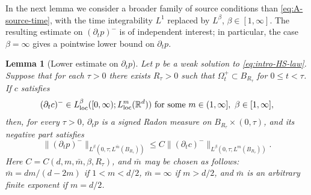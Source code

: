 \documentclass[11pt]{amsart}
\numberwithin{equation}{section}
\numberwithin{figure}{section}
\theoremstyle{plain}
\newtheorem{lem}[thm]{Lemma}
\theoremstyle{definition}
\theoremstyle{remark}
\theoremstyle{plain}
\newcommand{\norm}[1]{\lVert #1 \rVert}
\def\R{\mathbb{R}}
\begin{document}
In the next lemma we consider a broader family of source conditions than
\eqref{eq:A-source-time}, with the time integrability \(L^1\) replaced by \(L^\beta\),
\(\beta\in[1,\infty]\). The resulting estimate on \((\partial_t p)^-\) is of independent
interest; in particular, the case \(\beta=\infty\) gives a pointwise lower bound on
\(\partial_t p\).

\begin{lem}[Lower estimate on \(\partial_t p\)]
\label{lem:HS-finite-difference-pt-lower}
Let \(p\) be a weak solution to \eqref{eq:intro-HS-law}. Suppose that for each $\tau>0$ there exists \(R_{\tau}>0\) such that \(\Omega_t^{+}\subset B_{R_\tau}\) for \(0\leq t<\tau\). If $c$ satisfies
\begin{equation}\label{eq:HS-source-negative-time-derivative}
    (\partial_t c)^-
    \in L^\beta_{\operatorname{loc}}
    ([0,\infty);L^m_{\operatorname{loc}}(\R^d)) \hbox{ for some } m\in(1,\infty],\ \beta\in[1,\infty],
\end{equation}
then, for every $\tau>0$,  \(\partial_t p\) is a signed Radon
measure on \(B_{R_{\tau}} \times(0,\tau)\), and its negative part satisfies
\begin{equation}\label{eq:HS-pt-negative-part-regularity}
    \norm{(\partial_t p)^-}_{L^\beta(0,\tau;L^{\bar m}(B_{R_{\tau}}))}
    \leq
    C\norm{(\partial_t c)^-}_{L^\beta(0,\tau;L^m(B_{R_{\tau}}))}.
\end{equation}
Here \(C=C(d, m,\bar m,\beta,R_\tau)\), and \(\bar m\) may be chosen as follows: \(\bar m=d m/(d-2 m)\) if \(1< m<d/2\), \(\bar m=\infty\) if \(m>d/2\), and \(\bar m\) is an arbitrary finite exponent if \(m=d/2\).
\end{lem}
\end{document}
